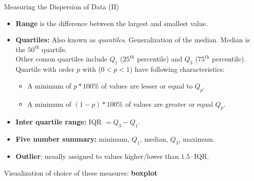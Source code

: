 \begin{frame}{Measuring the Dispersion of Data (II)}


  \begin{itemize}
  \item \textbf{Range} is the difference between the largest and smallest value.
  \item \textbf{Quartiles:} Also known as \textit{quantiles}. Generalization of the median. Median is the $50^{\text{th}}$ quartile.\\
    Other comon quartiles include $Q_1$ ($25^{\text{th}}$ percentile) and $Q_3$
    ($75^{\text{th}}$ percentile).\\\smallskip Quartile with order $p$ with
    ($0 < p < 1$) have following characteristics:
    \begin{itemize}
    \item A minimum of $p * 100\%$ of values are lesser or equal to $Q_p$.
    \item A minimum of $(1 - p) * 100\%$ of values are greater or equal $Q_p$.
    \end{itemize}
  \item \textbf{Inter quartile range:} IQR $=Q_3-Q_1$.
  \item \textbf{Five number summary:} minimum, $Q_1$, median, $Q_3$, maximum.
  \item \textbf{Outlier}: usually assigned to values higher/lower than $1.5 \cdot \text{IQR}$.
  \end{itemize}
  \vspace*{1em}
  Visualization of choice of these measures: \textbf{boxplot}


\end{frame}


